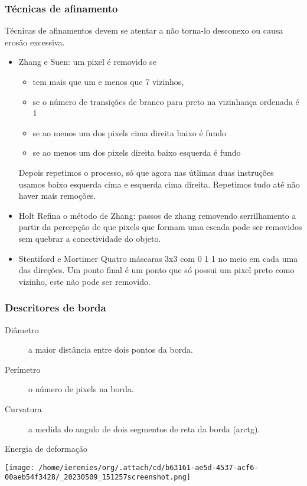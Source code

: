 \documentclass[twocolumn, 10pt]{article}
\begin{document}
\subsubsection*{Técnicas de afinamento}
\label{sec:org7af5875}
Técnicas de afinamentos devem se atentar a não torna-lo desconexo ou causa erosão excessiva.
\begin{itemize}
\item Zhang e Suen:
\label{sec:orged7c182}
um pixel é removido se
\begin{itemize}
\item tem mais que um e menos que 7 vizinhos,
\item se o número de transições de branco para preto na vizinhança ordenada é 1
\item se ao menos um dos pixels cima direita baixo é fundo
\item se ao menos um dos pixels direita baixo esquerda é fundo
\end{itemize}
Depois repetimos o processo, só que agora nas útlimas duas instruções usamos baixo esquerda cima e esquerda cima direita.
Repetimos tudo até não haver mais remoções.

\item Holt
\label{sec:orgd7c9427}
Refina o método de Zhang: passos de zhang removendo serrilhamento a partir da percepção de que pixels que formam uma escada pode ser removidos sem quebrar a conectividade do objeto.
\item Stentiford e Mortimer
\label{sec:orgd61eea5}
Quatro máscaras 3x3 com 0 1 1 no meio em cada uma das direções.
Um ponto final é um ponto que só possui um pixel preto como vizinho, este não pode ser removido.
\end{itemize}
\subsubsection*{Descritores de borda}
\label{sec:orgbc0bc3b}
\begin{description}
\item[{Diâmetro}] a maior distância entre dois pontos da borda.
\item[{Perímetro}] o número de pixels na borda.
\item[{Curvatura}] a medida do angulo de dois segmentos de reta da borda (arctg).
\item[{Energia de deformação}] 
\end{description}
\begin{center}
\texttt{[image: /home/ieremies/org/.attach/cd/b63161-ae5d-4537-acf6-00aeb54f3428/\_20230509\_151257screenshot.png]}
\end{center}
\end{document}
